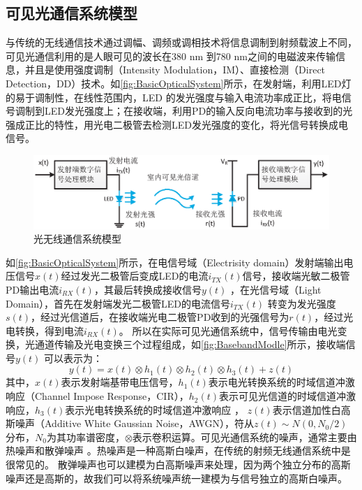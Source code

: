 \subsection{可见光通信系统模型}
与传统的无线通信技术通过调幅、调频或调相技术将信息调制到射频载波上不同，可见光通信利用的是人眼可见的波长在380 nm 到780 nm之间的电磁波来传输信息，并且是使用强度调制（Intensity Modulation，IM）、直接检测（Direct Detection，DD）技术。如\autoref{fig:BasicOpticalSystem}所示，在发射端，利用LED灯的易于调制性，在线性范围内，LED 的发光强度与输入电流功率成正比，将电信号调制到LED发光强度上；在接收端，利用PD的输入反向电流功率与接收到的光强成正比的特性，用光电二极管去检测LED发光强度的变化，将光信号转换成电信号。
\begin{figure}[htbp]
    \centering
    \includegraphics[width=\textwidth]{figures/chapter-2/BasicOpticalSystem.eps}
    \caption{光无线通信系统模型}
    \label{fig:BasicOpticalSystem}
\end{figure}
如\autoref{fig:BasicOpticalSystem}所示，在电信号域（Electrisity domain）发射端输出电压信号$x(t)$经过发光二极管后变成LED的电流$i_{TX}(t)$信号，接收端光敏二极管PD输出电流$i_{RX}(t)$，其最后转换成接收信号$y(t)$ ，在光信号域（Light Domain），首先在发射端发光二极管LED的电流信号$i_{TX}(t)$ 转变为发光强度$s(t)$，经过光信道后，在接收端光电二极管PD收到的光强信号为$r(t)$，经过光电转换，得到电流$i_{RX}(t)$。
所以在实际可见光通信系统中，信号传输由电光变换，光通道传输及光电变换三个过程组成，如\autoref{fig:BasebandModle}所示，接收端信号$y(t)$ 可以表示为：
\begin{equation}
    y(t)=x(t)\otimes h_1(t)\otimes h_2(t)\otimes h_3(t)+z(t)
\end{equation}
其中，$x(t)$表示发射端基带电压信号，$h_1(t)$表示电光转换系统的时域信道冲激响应（Channel Impose Response，CIR），$h_2(t)$表示可见光信道的时域信道冲激响应，$h_3(t)$表示光电转换系统的时域信道冲激响应
\cite{Yangxuecheng2015}，
$z(t)$表示信道加性白高斯噪声（Additive White Gaussian Noise，AWGN），符从$z(t)\sim N(0,N_0/2)$分布，$N_0$为其功率谱密度，$\otimes$表示卷积运算。可见光通信系统的噪声，通常主要由热噪声和散弹噪声
\cite{Chenchunyan2014}。热噪声是一种高斯白噪声，在传统的射频无线通信系统中是很常见的。
散弹噪声也可以建模为白高斯噪声来处理，因为两个独立分布的高斯噪声还是高斯的，故我们可以将系统噪声统一建模为与信号独立的高斯白噪声。

